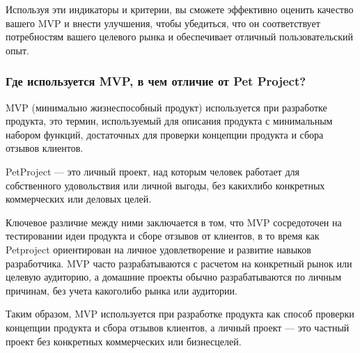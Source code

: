 \documentclass[letterpaper,10pt,russian]{sphinxmanual}
\begin{document}
\sphinxAtStartPar
Используя эти индикаторы и критерии, вы сможете эффективно оценить качество вашего MVP и внести улучшения, чтобы убедиться, что он соответствует потребностям вашего целевого рынка и обеспечивает отличный пользовательский опыт.


\subsubsection{Где используется MVP, в чем отличие от Pet Project?}
\label{\detokenize{educational_materials/mvp/content:mvp-pet-project}}
\sphinxAtStartPar
MVP (минимально жизнеспособный продукт) используется при разработке продукта, это термин, используемый для описания продукта с минимальным набором функций, достаточных для проверки концепции продукта и сбора отзывов клиентов.

\sphinxAtStartPar
PetProject — это личный проект, над которым человек работает для собственного удовольствия или личной выгоды, без каких\sphinxhyphen{}либо конкретных коммерческих или деловых целей.

\sphinxAtStartPar
Ключевое различие между ними заключается в том, что MVP сосредоточен на тестировании идеи продукта и сборе отзывов от клиентов, в то время как Pet\sphinxhyphen{}project ориентирован на личное удовлетворение и развитие навыков разработчика. MVP часто разрабатываются с расчетом на конкретный рынок или целевую аудиторию, а домашние проекты обычно разрабатываются по личным причинам, без учета какого\sphinxhyphen{}либо рынка или аудитории.

\sphinxAtStartPar
Таким образом, MVP используется при разработке продукта как способ проверки концепции продукта и сбора отзывов клиентов, а личный проект — это частный проект без конкретных коммерческих или бизнес\sphinxhyphen{}целей.
\end{document}
